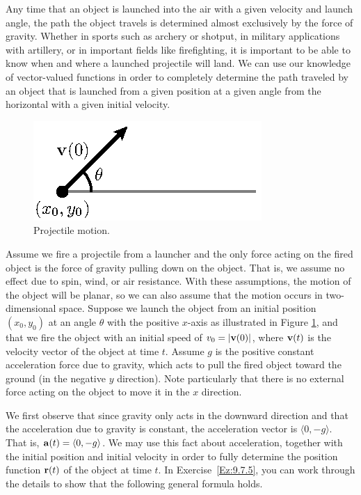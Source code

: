 %

Any time that an object is launched into the air with a given velocity
and launch angle, the path the object travels is determined almost
exclusively by the force of gravity.  Whether in sports such as
archery or shotput, in military applications with artillery, or in
important fields like firefighting, it is important to be able to know
when and where a launched projectile will land.  We can use our
knowledge of vector-valued functions in order to completely determine
the path traveled by an object that is launched from a given position
at a given angle from the horizontal with a given initial velocity.

\begin{figure}[ht]
\begin{center} 
\includegraphics{figures/fig_9_7_projectile.eps}
\caption{Projectile motion.}
\label{F:9.7.Motion}
\end{center}
\end{figure}

Assume we fire a projectile from a launcher and the only force acting
on the fired object is the force of gravity pulling down on the
object.  That is, we assume no effect due to spin, wind, or air
resistance.  With these assumptions, the motion of the object will be
planar, so we can also assume that the motion occurs in
two-dimensional space. Suppose we launch the object from an initial
position $(x_0, y_0)$ at an angle $\theta$ with the positive $x$-axis
as illustrated in Figure \ref{F:9.7.Motion}, and that we fire the
object with an initial speed of $v_0 = |\mathbf{v}(0)|$, where $\mathbf{v}(t)$ is
the velocity vector of the object at time $t$.  Assume $g$ is the
positive constant acceleration force due to gravity, which acts to
pull the fired object toward the ground (in the negative $y$
direction). Note particularly that there is no external force acting
on the object to move it in the $x$ direction.

We first observe that since gravity only acts in the downward
direction and that the acceleration due to gravity is constant,
the acceleration vector is $\langle 0, -g
\rangle$.  That is, $\mathbf{a}(t) = \langle 0, -g \rangle$.  We may use this
fact about acceleration, together with the initial position and
initial velocity in order to fully determine the position function
$\mathbf{r}(t)$ of the object at time $t$.  In Exercise~\ref{Ez:9.7.5}, you
can work through the details to show that the following general
formula holds.

